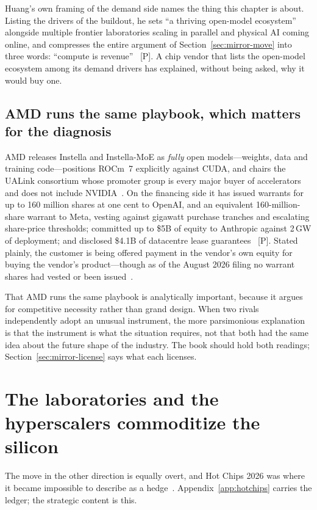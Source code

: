 Huang's own framing of the demand side names the thing this chapter is about. Listing the drivers of the buildout, he sets ``a thriving open-model ecosystem'' alongside multiple frontier laboratories scaling in parallel and physical AI coming online, and compresses the entire argument of Section~\ref{sec:mirror-move} into three words: ``compute is revenue''~\cite{nvda-huang-q2} [P]. A chip vendor that lists the open-model ecosystem among its demand drivers has explained, without being asked, why it would buy one.

\subsection{AMD runs the same playbook, which matters for the diagnosis}

AMD releases Instella and Instella-MoE as \emph{fully} open models---weights, data and training code---positions ROCm~7 explicitly against CUDA, and chairs the UALink consortium whose promoter group is every major buyer of accelerators and does not include NVIDIA~\cite{amd-open}. On the financing side it has issued warrants for up to 160 million shares at one cent to OpenAI, and an equivalent 160-million-share warrant to Meta, vesting against gigawatt purchase tranches and escalating share-price thresholds; committed up to \$5B of equity to Anthropic against 2\,GW of deployment; and disclosed \$4.1B of datacentre lease guarantees~\cite{amd-warrants,amd-q2-2026} [P]. Stated plainly, the customer is being offered payment in the vendor's own equity for buying the vendor's product---though as of the August 2026 filing no warrant shares had vested or been issued~\cite{amd-warrants}.

That AMD runs the same playbook is analytically important, because it argues for competitive necessity rather than grand design. When two rivals independently adopt an unusual instrument, the more parsimonious explanation is that the instrument is what the situation requires, not that both had the same idea about the future shape of the industry. The book should hold both readings; Section~\ref{sec:mirror-license} says what each licenses.

\section{The laboratories and the hyperscalers commoditize the silicon}
\label{sec:mirror-silicon}

The move in the other direction is equally overt, and Hot Chips 2026 was where it became impossible to describe as a hedge~\cite{hc2026}. Appendix~\ref{app:hotchips} carries the ledger; the strategic content is this.

